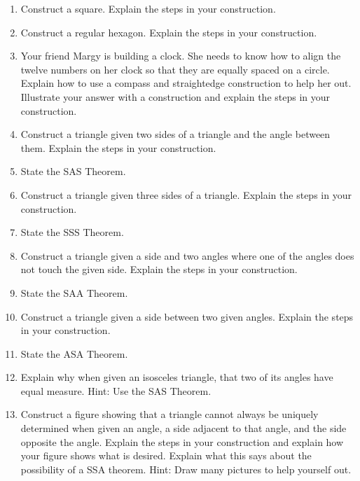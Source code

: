 \begin{problems}
\begin{enumerate}


\item Construct a square. Explain the steps in your construction.

\item Construct a regular hexagon. Explain the steps in your construction.


\item Your friend Margy is building a clock. She needs to know how to align
the twelve numbers on her clock so that they are equally spaced on a
circle. Explain how to use a compass and straightedge construction to
help her out. Illustrate your answer with a construction and explain
the steps in your construction.

\item Construct a triangle given two sides of a triangle and the angle
  between them. Explain the steps in your construction.

\item State the SAS Theorem.

\item Construct a triangle given three sides of a triangle. Explain
  the steps in your construction.

\item State the SSS Theorem.


\item Construct a triangle given a side and two angles where one of
  the angles does not touch the given side. Explain the steps in your
  construction.

\item State the SAA Theorem.

\item Construct a triangle given a side between two given
  angles. Explain the steps in your construction.

\item State the ASA Theorem.

\item Explain why when given an isosceles triangle, that two
  of its angles have equal measure. Hint: Use the SAS Theorem.


\item Construct a figure showing that a triangle cannot always be
  uniquely determined when given an angle, a side adjacent to that
  angle, and the side opposite the angle. Explain the steps in your
  construction and explain how your figure shows what is
  desired. Explain what this says about the possibility of a SSA
  theorem.  Hint: Draw many pictures to help yourself out.


\end{enumerate}
\end{problems}
